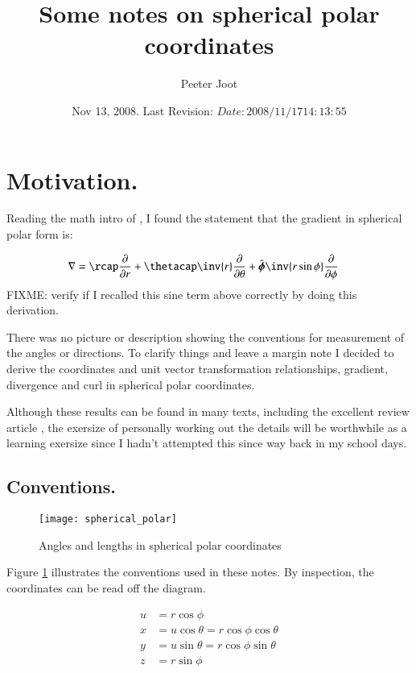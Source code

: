 \documentclass{article}
\title{Some notes on spherical polar coordinates}
\author{Peeter Joot}
\date{ Nov 13, 2008.  Last Revision: $Date: 2008/11/17 14:13:55 $ }
\newcommand{\phicap}[0]{\hat{\boldsymbol{\phi}}}
\begin{document}
\maketitle{}
\tableofcontents

\section{ Motivation. }

Reading the math intro of \cite{zeilik1998iaa}, I found the statement that the gradient in spherical polar form is:

\begin{align*}
\grad &= 
\rcap \PD{r}{}
+\thetacap \inv{r} \PD{\theta}{}
+\phicap \inv{r \sin\phi}\PD{\phi}{}
\end{align*}
FIXME: verify if I recalled this sine term above correctly by doing this derivation.

There was no picture or description showing the conventions for measurement of the angles or directions.
To clarify things and leave a margin note I decided to derive the coordinates and unit vector transformation relationships,
gradient, divergence and curl in spherical polar coordinates.

Although these results can be found in many texts, including the excellent review article \cite{fleischCoords}, 
the exersize of personally working out the details will be worthwhile as a learning exersize since I hadn't attempted this since
way back in my school days.

\subsection{ Conventions. }

\begin{figure}[htp]
\centering
\texttt{[image: spherical\_polar]}
\caption{Angles and lengths in spherical polar coordinates}\label{fig:spherical_polar}
\end{figure}

Figure \ref{fig:spherical_polar} illustrates the conventions used in 
these notes.  By inspection, the coordinates can be read off the diagram.

\begin{align}\label{eqn:coordinates}
u &= r \cos\phi \\
x &= u \cos\theta = r \cos\phi \cos\theta \\
y &= u \sin\theta = r \cos\phi \sin\theta \\
z &= r \sin\phi
\end{align}
\end{document}
